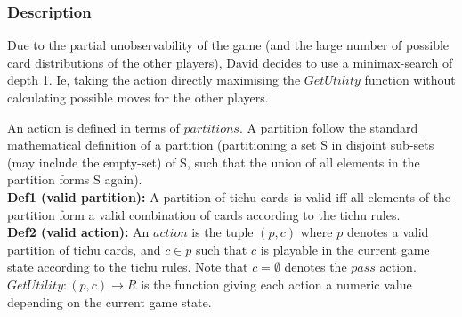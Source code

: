 \documentclass{article}
\begin{document}
\subsubsection*{Description}
Due to the partial unobservability of the game (and the large number of possible card distributions of the other players), David decides to use a minimax-search of depth 1. Ie, taking the action directly maximising the $GetUtility$ function without calculating possible moves for the other players.

An action is defined in terms of $partitions$. A partition follow the standard mathematical definition of a partition (partitioning a set S in disjoint sub-sets (may include the empty-set) of S, such that the union of all elements in the partition forms S again).\\

\textbf{Def1 (valid partition):} A partition of tichu-cards is valid iff all elements of the partition form a valid combination of cards according to the tichu rules.\\

\textbf{Def2 (valid action):} An $action$ is the tuple $(p, c)$ where $p$ denotes a valid partition of tichu cards, and $c \in p$ such that $c$ is playable in the current game state according to the tichu rules. Note that $c = \emptyset$ denotes the $pass$ action.\\

$GetUtility: (p, c) \rightarrow R$ is the function giving each action a numeric value depending on the current game state.
\end{document}
